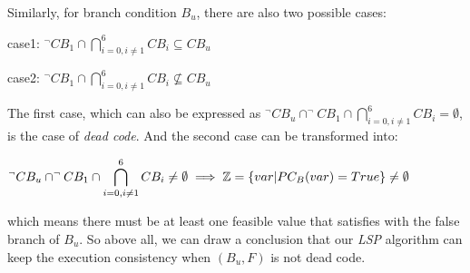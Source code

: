 Similarly, for branch condition $B_u$, there are also two possible cases:
\begin{center}
case1: $\displaystyle ^\neg CB_1 \cap \bigcap\limits_{i=0,i\neq 1}^6 CB_i \subseteq CB_u$

case2: $\displaystyle ^\neg CB_1 \cap \bigcap\limits_{i=0,i\neq 1}^6 CB_i \nsubseteq CB_u$
\end{center}

The first case, which can also be expressed as $^\neg CB_u \cap ^\neg CB_1 \cap \bigcap_{i=0,i\neq 1}^6 CB_i = \emptyset$, is the case of \emph{dead code}. And the second case can be transformed into:
\begin{center}
$\displaystyle ^\neg CB_u \cap ^\neg CB_1 \cap \bigcap\limits_{i=0,i\neq 1}^6 CB_i \neq \emptyset \implies \mathbb{Z} = \{var\arrowvert PC_B(var) = True\} \neq \emptyset$
\end{center}

\noindent which means there must be at least one feasible value that satisfies with the false branch of $B_u$. So above all, we can draw a conclusion that our \emph{LSP} algorithm can keep the execution consistency when $(B_u, F)$ is not dead code.